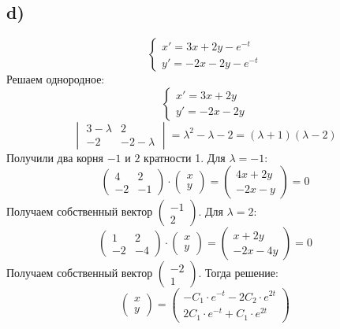 \documentclass[a4paper,12pt]{article}
\begin{document}
\subsection*{d)}
\[
\begin{cases}
x' = 3x + 2y - e^{-t} \\
y' = -2x -2y - e^{-t}
\end{cases}
\]
Решаем однородное:
\[
\begin{cases}
x' = 3x + 2y \\
y' = -2x -2y 
\end{cases}
\]
\[
\begin{vmatrix}
3 - \lambda & 2 \\
-2 & -2 - \lambda 
\end{vmatrix}
=
\lambda^2 -\lambda -2 =  (\lambda + 1)(\lambda -2)
\]
Получили два корня $-1$ и $2$ кратности 1. Для $\lambda = -1$:
\[
\begin{pmatrix}
4 & 2 \\
-2 & -1
\end{pmatrix}
\cdot
\begin{pmatrix}
x \\ y
\end{pmatrix}
=
\begin{pmatrix}
4x + 2y \\
-2x - y
\end{pmatrix}
=
0
\]
Получаем собственный вектор $\begin{pmatrix}
-1 \\ 2
\end{pmatrix}$. Для $\lambda = 2$:
\[
\begin{pmatrix}
1 & 2  \\
-2 & -4
\end{pmatrix}
\cdot
\begin{pmatrix}
x \\ y
\end{pmatrix}
=
\left(\begin{matrix}
x+2y \\
-2x-4y
\end{matrix}\right)
=
0
\]
Получаем собственный вектор $\begin{pmatrix}
-2 \\ 1
\end{pmatrix}$. Тогда решение:
\[
\begin{pmatrix}
x \\ y
\end{pmatrix}
=
\begin{pmatrix}
-C_1 \cdot e^{-t} - 2C_2 \cdot e^{2t} \\
2C_1 \cdot e^{-t} + C_1 \cdot e^{2t}
\end{pmatrix}
\]
\end{document}
